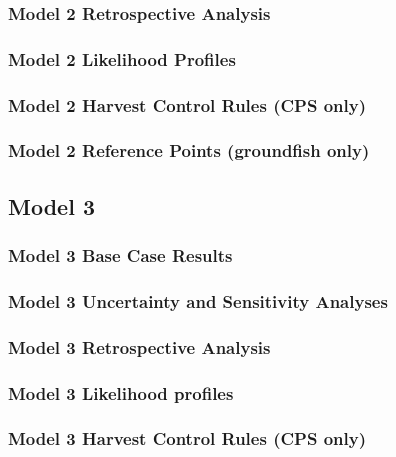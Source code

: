 \documentclass[12pt,]{article}
\begin{document}
\subsubsection{Model 2 Retrospective
Analysis}\label{model-2-retrospective-analysis}

\subsubsection{Model 2 Likelihood
Profiles}\label{model-2-likelihood-profiles}

\subsubsection{Model 2 Harvest Control Rules (CPS
only)}\label{model-2-harvest-control-rules-cps-only}

\subsubsection{Model 2 Reference Points (groundfish
only)}\label{model-2-reference-points-groundfish-only}

\subsection{Model 3}\label{model-3}

\subsubsection{Model 3 Base Case
Results}\label{model-3-base-case-results}

\subsubsection{Model 3 Uncertainty and Sensitivity
Analyses}\label{model-3-uncertainty-and-sensitivity-analyses}

\subsubsection{Model 3 Retrospective
Analysis}\label{model-3-retrospective-analysis}

\subsubsection{Model 3 Likelihood
profiles}\label{model-3-likelihood-profiles}

\subsubsection{Model 3 Harvest Control Rules (CPS
only)}\label{model-3-harvest-control-rules-cps-only}
\end{document}
